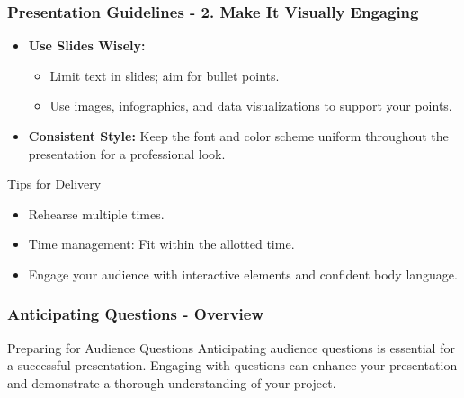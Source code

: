\documentclass[aspectratio=169]{beamer}
\begin{document}
\begin{frame}[fragile]
    \frametitle{Presentation Guidelines - 2. Make It Visually Engaging}
    \begin{itemize}
        \item \textbf{Use Slides Wisely:} 
            \begin{itemize}
                \item Limit text in slides; aim for bullet points.
                \item Use images, infographics, and data visualizations to support your points.
            \end{itemize}
        \item \textbf{Consistent Style:} Keep the font and color scheme uniform throughout the presentation for a professional look.
    \end{itemize}
    
    \begin{block}{Tips for Delivery}
        \begin{itemize}
            \item Rehearse multiple times.
            \item Time management: Fit within the allotted time.
            \item Engage your audience with interactive elements and confident body language.
        \end{itemize}
    \end{block}
\end{frame}

\begin{frame}[fragile]
    \frametitle{Anticipating Questions - Overview}
    \begin{block}{Preparing for Audience Questions}
        Anticipating audience questions is essential for a successful presentation. Engaging with questions can enhance your presentation and demonstrate a thorough understanding of your project.
    \end{block}
\end{frame}
\end{document}
